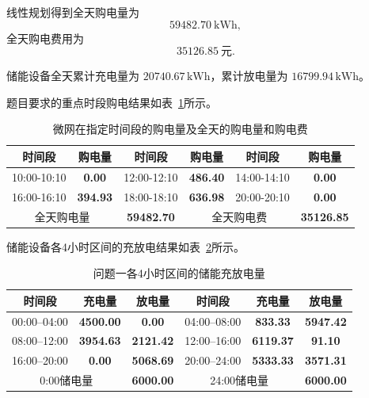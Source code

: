 线性规划得到全天购电量为
\[
\boxed{59482.70\ \mathrm{kWh}},
\]
全天购电费用为
\[
\boxed{35126.85\ \mathrm{元}}.
\]

储能设备全天累计充电量为 \(20740.67\,\mathrm{kWh}\)，累计放电量为 \(16799.94\,\mathrm{kWh}\)。

题目要求的重点时段购电结果如表~\ref{tab:q1_purchase_result}所示。

\begin{table}[H]
    \centering
    \caption{微网在指定时间段的购电量及全天的购电量和购电费 }
    \label{tab:q1_purchase_result}
    \begin{tabular}{|c|c|c|c|c|c|}
        \hline
        时间段 & 购电量 & 时间段 & 购电量 & 时间段 & 购电量 \\
        \hline
        10:00-10:10 & \textbf{0.00} & 12:00-12:10 & \textbf{486.40} & 14:00-14:10 & \textbf{0.00} \\
        \hline
        16:00-16:10 & \textbf{394.93} & 18:00-18:10 & \textbf{636.98} & 20:00-20:10 & \textbf{0.00} \\
        \hline
        \multicolumn{2}{|c|}{全天购电量} & \multicolumn{1}{c|}{\textbf{59482.70}} & \multicolumn{2}{c|}{全天购电费} & \multicolumn{1}{c|}{\textbf{35126.85}}\\
        \hline
    \end{tabular}
\end{table}

储能设备各4小时区间的充放电结果如表~\ref{tab:q1_storage_result}所示。

\begin{table}[H]
    \centering
    \caption{问题一各4小时区间的储能充放电量}
    \label{tab:q1_storage_result}
    \begin{tabular}{|c|c|c|c|c|c|}
        \hline
        时间段 & 充电量 & 放电量 & 时间段 & 充电量 & 放电量 \\
        \hline
        00:00--04:00 & \textbf{4500.00} & \textbf{0.00} & 04:00--08:00 & \textbf{833.33} & \textbf{5947.42} \\
        \hline
        08:00--12:00 & \textbf{3954.63} & \textbf{2121.42} & 12:00--16:00 & \textbf{6119.37} & \textbf{91.10} \\
        \hline
        16:00--20:00 & \textbf{0.00} & \textbf{5068.69} & 20:00--24:00 & \textbf{5333.33} & \textbf{3571.31} \\
        \hline
        \multicolumn{2}{|c|}{0:00储电量} & \multicolumn{1}{|c|}{\textbf{6000.00}} & \multicolumn{2}{c|}{24:00储电量} & \multicolumn{1}{c|}{\textbf{6000.00}}\\
        \hline
    \end{tabular}
\end{table}


